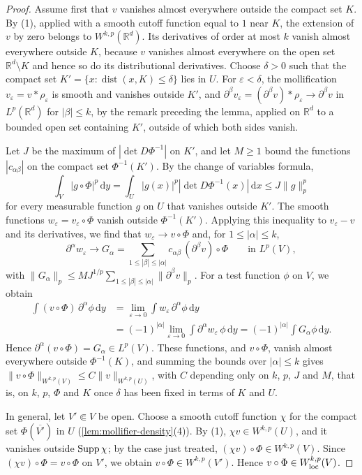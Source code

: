 \begin{proof}
Assume first that $v$ vanishes almost everywhere outside the compact set $K$. By (1), applied with a smooth cutoff function equal to $1$ near $K$, the extension of $v$ by zero belongs to $W^{k,p}(\mathbb R^d)$. Its derivatives of order at most $k$ vanish almost everywhere outside $K$, because $v$ vanishes almost everywhere on the open set $\mathbb R^d\setminus K$ and hence so do its distributional derivatives. Choose $\delta>0$ such that the compact set $K'=\{x:\operatorname{dist}(x,K)\leq\delta\}$ lies in $U$. For $\varepsilon<\delta$, the mollification $v_\varepsilon=v*\rho_\varepsilon$ is smooth and vanishes outside $K'$, and $\partial^\beta v_\varepsilon=(\partial^\beta v)*\rho_\varepsilon\to\partial^\beta v$ in $L^p(\mathbb R^d)$ for $|\beta|\leq k$, by the remark preceding the lemma, applied on $\mathbb R^d$ to a bounded open set containing $K'$, outside of which both sides vanish.

Let $J$ be the maximum of $|\det D\Phi^{-1}|$ on $K'$, and let $M\geq1$ bound the functions $|c_{\alpha\beta}|$ on the compact set $\Phi^{-1}(K')$. By the change of variables formula,
\[
 \int_V|g\circ\Phi|^p\,\mathrm d y=\int_U|g(x)|^p|\det D\Phi^{-1}(x)|\,\mathrm d x\leq J\|g\|_p^p
\]
for every measurable function $g$ on $U$ that vanishes outside $K'$. The smooth functions $w_\varepsilon=v_\varepsilon\circ\Phi$ vanish outside $\Phi^{-1}(K')$. Applying this inequality to $v_\varepsilon-v$ and its derivatives, we find that $w_\varepsilon\to v\circ\Phi$ and, for $1\leq|\alpha|\leq k$,
\[
 \partial^\alpha w_\varepsilon\to G_\alpha=\sum_{1\leq|\beta|\leq|\alpha|}c_{\alpha\beta}\,(\partial^\beta v)\circ\Phi\qquad\text{in }L^p(V),
\]
with $\|G_\alpha\|_p\leq MJ^{1/p}\sum_{1\leq|\beta|\leq|\alpha|}\|\partial^\beta v\|_p$. For a test function $\phi$ on $V$, we obtain
\[
\begin{split}
 \int(v\circ\Phi)\,\partial^\alpha\phi\,\mathrm d y&=\lim_{\varepsilon\to0}\int w_\varepsilon\,\partial^\alpha\phi\,\mathrm d y\\
 &=(-1)^{|\alpha|}\lim_{\varepsilon\to0}\int\partial^\alpha w_\varepsilon\,\phi\,\mathrm d y=(-1)^{|\alpha|}\int G_\alpha\phi\,\mathrm d y.
\end{split}
\]
Hence $\partial^\alpha(v\circ\Phi)=G_\alpha\in L^p(V)$. These functions, and $v\circ\Phi$, vanish almost everywhere outside $\Phi^{-1}(K)$, and summing the bounds over $|\alpha|\leq k$ gives $\|v\circ\Phi\|_{W^{k,p}(V)}\leq C\|v\|_{W^{k,p}(U)}$, with $C$ depending only on $k$, $p$, $J$ and $M$, that is, on $k$, $p$, $\Phi$ and $K$ once $\delta$ has been fixed in terms of $K$ and $U$.

In general, let $V'\Subset V$ be open. Choose a smooth cutoff function $\chi$ for the compact set $\Phi(\overline{V'})$ in $U$ (\cref{lem:mollifier-density}(4)). By (1), $\chi v\in W^{k,p}(U)$, and it vanishes outside $\operatorname{Supp}\chi$; by the case just treated, $(\chi v)\circ\Phi\in W^{k,p}(V)$. Since $(\chi v)\circ\Phi=v\circ\Phi$ on $V'$, we obtain $v\circ\Phi\in W^{k,p}(V')$. Hence $v\circ\Phi\in W^{k,p}_{\mathrm{loc}}(V)$.
\end{proof}

